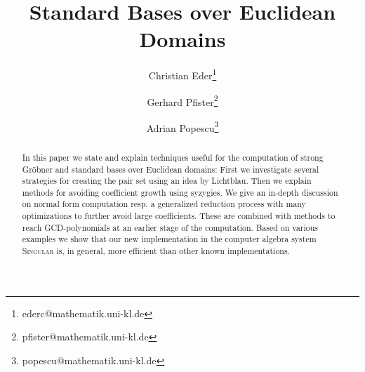 \documentclass[a4paper, 11pt]{article}
\providecommand{\keywords}[1]{\textbf{\textit{Keywords---}} #1}
\newcommand{\singular}{\textsc{Singular}\xspace}
\newcommand{\gpts}{GCD-poly\-no\-mials\xspace}
\begin{document}

\title{Standard Bases over Euclidean Domains}

\author{Christian Eder\thanks{ederc@mathematik.uni-kl.de}}
\author{Gerhard Pfister\thanks{pfister@mathematik.uni-kl.de}}
\author{Adrian Popescu\thanks{popescu@mathematik.uni-kl.de}}


%

 \maketitle

\begin{abstract}
In this paper we state and explain techniques useful for the computation of
strong Gr\"obner and standard bases over Euclidean domains: First we investigate
several strategies for creating the pair set using an idea by Lichtblau.
Then we explain methods for avoiding coefficient growth using syzygies.
We give an in-depth discussion on normal form computation resp. a generalized reduction
process with many optimizations to further avoid large coefficients. These are
combined with methods to reach \gpts at an earlier stage of the computation.
Based on various examples we show that our new implementation in the
computer algebra system \singular is, in general, more efficient than other
known implementations.
\end{abstract}
\end{document}
